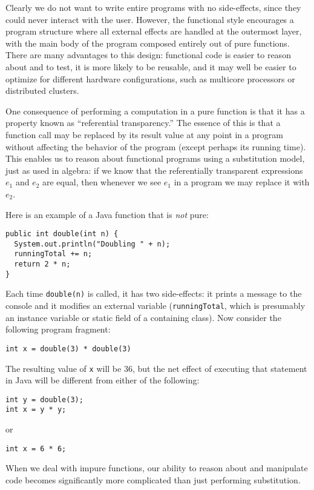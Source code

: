 Clearly we do not want to write entire programs with no side-effects, since they could never interact with the user. However, the functional style encourages a program structure where all external effects are handled at the outermost layer, with the main body of the program composed entirely out of pure functions. There are many advantages to this design: functional code is easier to reason about and to test, it is more likely to be reusable, and it may well be easier to optimize for different hardware configurations, such as multicore processors or distributed clusters.

One consequence of performing a computation in a pure function is that it has a property known as ``referential transparency.'' The essence of this is that a function call may be replaced by its result value at any point in a program without affecting the behavior of the program (except perhaps its running time). This enables us to reason about functional programs using a substitution model, just as used in algebra: if we know that the referentially transparent expressions $e_1$ and $e_2$ are equal, then whenever we see $e_1$ in a program we may replace it with $e_2$.

Here is an example of a Java function that is \emph{not} pure:
\begin{verbatim}
public int double(int n) {
  System.out.println("Doubling " + n);
  runningTotal += n;
  return 2 * n;
}
\end{verbatim}
Each time \verb|double(n)| is called, it has two side-effects: it prints a message to the console and it modifies an external variable (\verb|runningTotal|, which is presumably an instance variable or static field of a containing class). Now consider the following program fragment:
\begin{verbatim}
int x = double(3) * double(3)
\end{verbatim}
The resulting value of \verb|x| will be 36, but the net effect of executing that statement in Java will be different from either of the following:
\begin{verbatim}
int y = double(3);
int x = y * y;
\end{verbatim}
or
\begin{verbatim}
int x = 6 * 6;
\end{verbatim}
When we deal with impure functions, our ability to reason about and manipulate code becomes significantly more complicated than just performing substitution.

